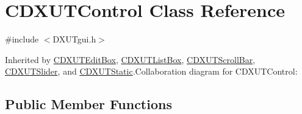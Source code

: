 \hypertarget{class_c_d_x_u_t_control}{
\section{CDXUTControl Class Reference}
\label{class_c_d_x_u_t_control}
}


{\ttfamily \#include $<$DXUTgui.h$>$}

Inherited by \hyperlink{class_c_d_x_u_t_edit_box}{CDXUTEditBox}, \hyperlink{class_c_d_x_u_t_list_box}{CDXUTListBox}, \hyperlink{class_c_d_x_u_t_scroll_bar}{CDXUTScrollBar}, \hyperlink{class_c_d_x_u_t_slider}{CDXUTSlider}, and \hyperlink{class_c_d_x_u_t_static}{CDXUTStatic}.Collaboration diagram for CDXUTControl:\subsection*{Public Member Functions}
